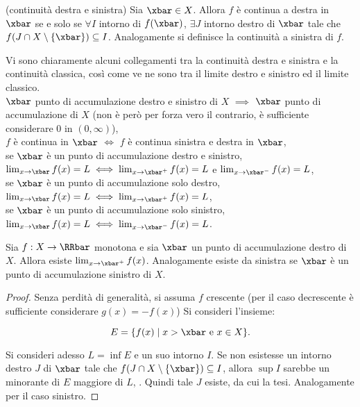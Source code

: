 \documentclass[11pt]{article}
\begin{document}
	\begin{definition}
		(continuità destra e sinistra) Sia $\xbar \in X$. Allora $f$ è continua
		a destra in $\xbar$ se e solo se $\forall I$ intorno di $f(\xbar)$,
		$\exists J$ intorno destro di $\xbar$ tale che $f(J \cap X \setminus \{\xbar\}) \subseteq I$. Analogamente si definisce la continuità
		a sinistra di $f$.
	\end{definition}

	\begin{remark}
		Vi sono chiaramente alcuni collegamenti tra la continuità destra e sinistra e la continuità classica,
		così come ve ne sono tra il limite destro e sinistro ed il limite classico. \\
		
		\li $\xbar$ punto di accumulazione destro e sinistro di $X$ $\implies$ $\xbar$ punto di accumulazione di $X$ (non
		è però per forza vero il contrario, è sufficiente considerare $0$ in $(0, \infty)$), \\
		\li $f$ è continua in $\xbar$ $\iff$ $f$ è continua sinistra e destra in $\xbar$, \\
		\li se $\xbar$ è un punto di accumulazione destro e sinistro, $\lim_{x \to \xbar} f(x) = L \iff \lim_{x \to \xbar^+} f(x) = L$ e $\lim_{x \to \xbar^-} f(x) = L$, \\
		\li se $\xbar$ è un punto di accumulazione solo destro, $\lim_{x \to \xbar} f(x) = L \iff \lim_{x \to \xbar^+} f(x) = L$, \\
		\li se $\xbar$ è un punto di accumulazione solo sinistro, $\lim_{x \to \xbar} f(x) = L \iff \lim_{x \to \xbar^-} f(x) = L$.
	\end{remark}
	
	\begin{proposition}
		Sia $f : X \to \RRbar$ monotona e sia $\xbar$ un punto di
		accumulazione destro di $X$. Allora esiste $\lim_{x \to \xbar^+} f(x)$.
		Analogamente esiste da sinistra se $\xbar$ è un punto di
		accumulazione sinistro di $X$.
	\end{proposition}

	\begin{proof}
		Senza perdità di generalità, si assuma $f$ crescente (per il caso decrescente è sufficiente considerare
		$g(x) = -f(x)$) Si consideri l'insieme:
		
		\[E = \{ f(x) \mid x > \xbar \text{ e } x \in X \}.\]
		
		Si consideri adesso $L = \inf E$ e un suo intorno $I$. Se non
		esistesse un intorno destro $J$ di $\xbar$ tale che $f(J \cap X \setminus \{\xbar\}) \subseteq I$, allora
		$\sup I$ sarebbe un minorante di $E$ maggiore di $L$, \Lightning. Quindi tale $J$ esiste, da cui la tesi.
		Analogamente per il caso sinistro.
	\end{proof}
\end{document}
